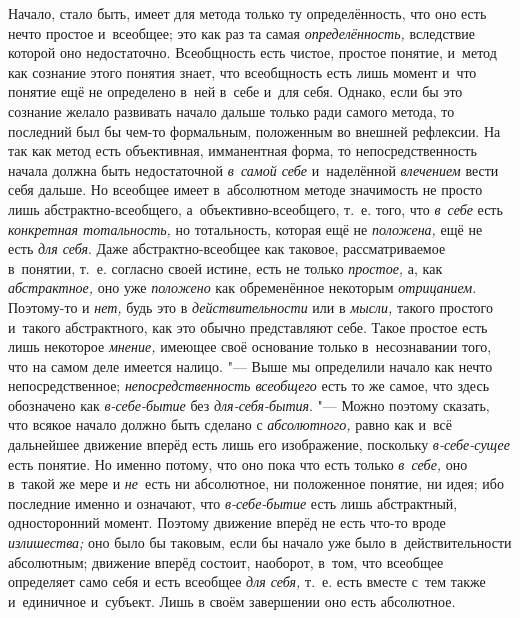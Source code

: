 Начало, стало быть, имеет для метода только ту определённость, что оно
есть нечто простое и~всеобщее; это как раз та самая {\em определённость,}
вследствие которой оно недостаточно. Всеобщность есть чистое,
простое понятие, и~метод как сознание этого понятия знает, что всеобщность
есть лишь момент и~что понятие ещё не определено в~ней в~себе и~для себя.
Однако, если бы это сознание желало развивать начало дальше только ради
самого метода, то последний был бы чем-то формальным, положенным во внешней
рефлексии. На так как метод есть объективная, имманентная форма, то
непосредственность начала должна быть недостаточной
{\em в~самой себе} и~наделённой {\em влечением}
вести себя дальше. Но всеобщее имеет в~абсолютном методе
значимость не просто лишь абстрактно-всеобщего, а~объективно-всеобщего,
т.~е. того, что {\em в~себе} есть {\em конкретная
тотальность,} но тотальность, которая ещё не
{\em положена,} ещё не есть {\em для себя}. Даже
абстрактно-всеобщее как таковое, рассматриваемое в~понятии, т.~е. согласно
своей истине, есть не только {\em простое,} а, как {\em абстрактное,} оно
уже {\em положено} как обременённое некоторым {\em отрицанием}.
Поэтому-то и {\em нет,} будь это в {\em действительности} или в {\em мысли,}
такого простого и~такого абстрактного, как это обычно
представляют себе. Такое простое есть лишь некоторое {\em мнение,} имеющее
своё основание только в~несознавании того, что на самом деле имеется
налицо. "--- Выше мы определили начало как нечто непосредственное;
{\em непосредственность всеобщего}
есть то же самое, что здесь обозначено как
{\em в-себе-бытие} без {\em для-себя-бытия}. "--- Можно поэтому
сказать, что всякое начало должно быть сделано с {\em абсолютного,}
равно как и~всё дальнейшее движение вперёд есть лишь его
изображение, поскольку {\em в-себе-сущее} есть
понятие. Но именно потому, что оно пока что есть только
{\em в~себе,} оно в~такой же мере и {\em не}~есть
ни абсолютное, ни положенное понятие, ни идея; ибо последние именно и
означают, что {\em в-себе-бытие}
есть лишь абстрактный, односторонний момент. Поэтому движение
вперёд не есть что-то вроде {\em излишества;} оно
было бы таковым, если бы начало уже было в~действительности абсолютным;
движение вперёд состоит, наоборот, в~том, что всеобщее определяет само себя
и есть всеобщее {\em для себя,}
т.~е. есть вместе с~тем также и~единичное и~субъект. Лишь в
своём завершении оно есть абсолютное.

